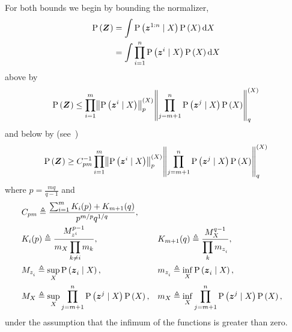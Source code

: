 \begin{proofE}
	For both bounds we begin by bounding the normalizer,
	\begin{equation*}
		\begin{split}
			\mathrm{P}\left({\boldsymbol Z_{}}\right) & =\int\mathrm{P}\left({\boldsymbol z_{}^{1:n}}\mid{\ensuremath{X_{}}}\right)\mathrm{P}\left({X_{}}\right)\mathrm{d}X_{}\\
			& =\int\prod_{i=1}^n\mathrm{P}\left({\boldsymbol z_{}^{i}}\mid{\ensuremath{X_{}}}\right)\mathrm{P}\left({X_{}}\right)\mathrm{d}X_{}
		\end{split}
	\end{equation*}
	above by
	\begin{equation}
		\prob{\observationsRV{}}\leq\prod_{i=1}^{m}\pnorm{\probcond{\observationRV{}{i}}{\states{}}}{p}{\states{}}\pnorm{\prod_{j=m+1}^n\probcond{\observationRV{}{j}}{\states{}}\prob{\states{}}}{q}{\states{}}
		\label{eq:holders}
	\end{equation}
	and below by (see~\cite{Wang77cmb})
	\begin{equation}
		\prob{\observationsRV{}}\geq C_{pm}^{-1}\prod_{i=1}^{m}\pnorm{\probcond{\observationRV{}{i}}{\states{}}}{p}{\states{}}\pnorm{\prod_{j=m+1}^n\probcond{\observationRV{}{j}}{\states{}}\prob{\states{}}}{q}{\states{}}\label{eq:reverse_holders}
	\end{equation}
	where $p=\frac{mq}{q-1}$ and
	\begin{align*}
		&C_{pm}\triangleq\frac{\sum_{i=1}^{m} K_i(p)+K_{m+1}(q)}{p^{m/p}q^{1/q}},\\
		&K_i(p)\triangleq\frac{M_{z_{}^{i}}^{p-1}}{\displaystyle m_{X_{}}\prod_{k\neq i}m_k},&&
		K_{m+1}(q)\triangleq\frac{M_{X_{}}^{q-1}}{\displaystyle\prod_{k}m_{z_{i}^{}}},\\
		&M_{z_{i}^{}}\triangleq\sup_{X_{}}\mathrm{P}\left({\boldsymbol z_{i}^{}}\mid{\ensuremath{X_{}}}\right),&&
		m_{z_{i}^{}}\triangleq\inf_{X_{}}\mathrm{P}\left({\boldsymbol z_{i}^{}}\mid{\ensuremath{X_{}}}\right),
		\\
		&M_{X_{}}\triangleq\sup_{X_{}}\prod_{j=m+1}^n\mathrm{P}\left({\boldsymbol z_{}^{j}}\mid{\ensuremath{X_{}}}\right)\mathrm{P}\left({X_{}}\right),&&
		m_{X_{}}\triangleq\inf_{X_{}}\prod_{j=m+1}^n\mathrm{P}\left({\boldsymbol z_{}^{j}}\mid{\ensuremath{X_{}}}\right)\mathrm{P}\left({X_{}}\right),
	\end{align*}
	under the assumption that the infimum of the functions is greater than zero.


\end{proofE}
